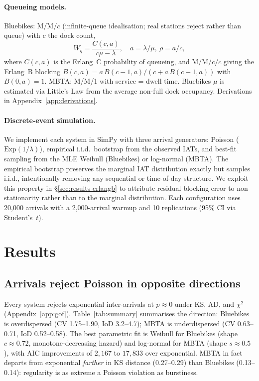 \paragraph{Queueing models.} Bluebikes: M/M/$c$ (infinite-queue idealisation; real stations reject rather than queue) with $c$ the dock count,
\begin{equation}
W_q = \frac{C(c, a)}{c\mu - \lambda}, \quad a = \lambda/\mu,\ \rho = a/c,
\label{eq:mmc}
\end{equation}
where $C(c,a)$ is the Erlang~C probability of queueing, and M/M/$c/c$ giving the Erlang~B blocking $B(c,a) = a\,B(c-1,a) / (c + a\,B(c-1,a))$ with $B(0,a) = 1$. MBTA: M/M/1 with service = dwell time. Bluebikes $\mu$ is estimated via Little's Law \cite{little1961} from the average non-full dock occupancy. Derivations in Appendix~\ref{app:derivations}.

\paragraph{Discrete-event simulation.} We implement each system in SimPy \cite{simpy} with three arrival generators: Poisson ($\mathrm{Exp}(1/\lambda)$), empirical i.i.d.\ bootstrap from the observed IATs, and best-fit sampling from the MLE Weibull (Bluebikes) or log-normal (MBTA). The empirical bootstrap preserves the marginal IAT distribution exactly but samples i.i.d., intentionally removing any sequential or time-of-day structure. We exploit this property in \S\ref{sec:results-erlangb} to attribute residual blocking error to non-stationarity rather than to the marginal distribution. Each configuration uses 20,000 arrivals with a 2,000-arrival warmup and 10 replications (95\% CI via Student's~$t$).

\section{Results}\label{sec:results}

\subsection{Arrivals reject Poisson in opposite directions}\label{sec:results-arrival}

Every system rejects exponential inter-arrivals at $p \approx 0$ under KS, AD, and $\chi^2$ (Appendix~\ref{app:gof}). Table~\ref{tab:summary} summarises the direction: Bluebikes is overdispersed ($\mathrm{CV}$ 1.75--1.90, IoD 3.2--4.7); MBTA is underdispersed ($\mathrm{CV}$ 0.63--0.71, IoD 0.52--0.58). The best parametric fit is Weibull for Bluebikes (shape $c \approx 0.72$, monotone-decreasing hazard) and log-normal for MBTA (shape $s \approx 0.5$), with AIC improvements of $2{,}167$ to $17{,}833$ over exponential. MBTA in fact departs from exponential \emph{farther} in KS distance (0.27--0.29) than Bluebikes (0.13--0.14): regularity is as extreme a Poisson violation as burstiness.

